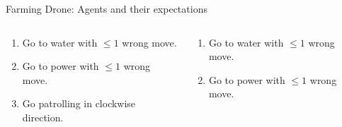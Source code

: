 \documentclass[usenames,dvipsnames]{beamer}
\begin{document}
\begin{frame}{Farming Drone: Agents and their expectations}
\begin{figure}
    \end{figure}
    \begin{columns} 
    \begin{column}{.5\textwidth}
    \begin{enumerate}
        \item Go to water with $\leq 1$ wrong move.
        \item Go to power with $\leq 1$ wrong move.
        \item Go patrolling in clockwise direction.
    \end{enumerate}
    \end{column}
    \begin{column}{.5\textwidth}
    \begin{enumerate}
        \item Go to water with $\leq 1$ wrong move.
        \item Go to power with $\leq 1$ wrong move.
    \end{enumerate}
    \end{column}
    \end{columns}
\end{frame}
\end{document}
